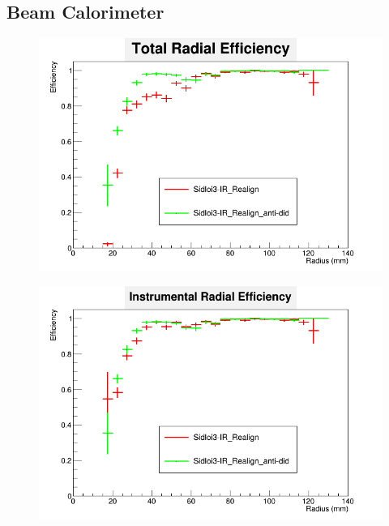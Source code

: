 \documentclass{report}
\begin{document}
            \subsection{Beam Calorimeter}
                \begin{figure}[H] 
                    \includegraphics[width=\textwidth]{RadialEfficiency_total_did}
                    \centering
                    \caption{}
                    \label{fig:did_beamcal_total}
                \end{figure}
                \begin{figure}[H]
                    \includegraphics[width=\textwidth]{RadialEfficiency_instrumental_did}
                    \centering
                    \caption{}
                    \label{fig:did_beamcal_inst}
                \end{figure}
\end{document}
